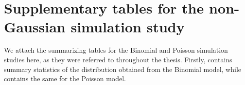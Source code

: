 \section{Supplementary tables for the non-Gaussian simulation study}
We attach the summarizing tables for the Binomial and Poisson simulation studies here, as they were referred to throughout the thesis. Firstly,  contains summary statistics of the distribution obtained from the Binomial model, while  contains the same for the Poisson model.
